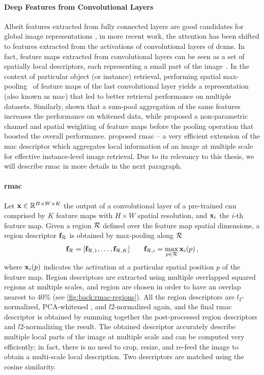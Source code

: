 \paragraph{Deep Features from Convolutional Layers}
Albeit features extracted from fully connected layers are good candidates for global image representations%
, in more recent work, the attention has been shifted to features extracted from the activations of convolutional layers of \glspl{dcnn}.
In fact, feature maps extracted from convolutional layers can be seen as a set of spatially local descriptors, each representing a small part of the image~\cite{liu2015treasure}.
In the context of particular object (or instance) retrieval, performing spatial max-pooling~\cite{azizpour2015generic,razavian2016visual} of feature maps of the last convolutional layer yields a representation (also known as \gls{mac}) that led to better retrieval performance on multiple datasets.
Similarly, \citet{babenko2015aggregating} shown that a sum-pool aggregation of the same features increases the performance on whitened data, while \citet{kalantidis2016cross} proposed a non-parametric channel and spatial weighting of feature maps before the pooling operation that boosted the overall performance.
\citet{tolias2016rmac} proposed \gls{rmac} -- a very efficient extension of the \gls{mac} descriptor which aggregates local information of an image at multiple scale for effective instance-level image retrieval.
Due to its relevancy to this thesis, we will describe \gls{rmac} in more details in the next paragraph.

\paragraph{\acrlong{rmac}}
Let $\mathbf{x} \in \mathbb{R}^{H \times W \times K}$ the output of a convolutional layer of a pre-trained \gls{cnn} comprised by $K$ feature maps with $H \times W$ spatial resolution, and $\mathbf{x}_i$ the $i$-th feature map.
Given a region $\mathcal{R}$ defined over the feature map spatial dimensions, a region descriptor $\mathbf{f}_{\mathcal{R}}$ is obtained by max-pooling along $\mathcal{R}$
\begin{equation} \label{eq:back:rmac-region}
    \mathbf{f}_{\mathcal{R}} = [\mathbf{f}_{\mathcal{R},1}, \ldots, \mathbf{f}_{\mathcal{R},K}] \qquad \mathbf{f}_{\mathcal{R},i} = \max_{p \in \mathcal{R}} \mathbf{x}_i(p) \,,
\end{equation}
where $\mathbf{x}_i(p)$ indicates the activation at a particular spatial position $p$ of the feature map.
Region descriptors are extracted using multiple overlapped squared regions at multiple scales, and region are chosen in order to have an overlap nearest to 40\% (see \ref{fig:back:rmac-regions}).
All the region descriptors are $l_2$-normalized, PCA-whitened%
, and $l2$-normalized again, and the final \gls{rmac} descriptor is obtained by summing together the post-processed region descriptors and $l2$-normalizing the result.
The obtained descriptor accurately describe multiple local parts of the image at multiple scale and can be computed very efficiently;
in fact, there is no need to crop, resize, and re-feed the image to obtain a multi-scale local description.
Two descriptors are matched using the cosine similarity.

